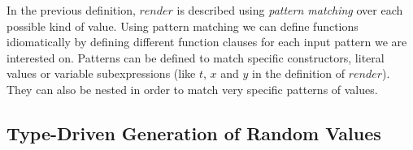 \documentclass[conference, fleqn]{IEEEtran}
\newcommand{\Varid}[1]{\mathit{#1}}
\begin{document}
In the previous definition, \ensuremath{\Varid{render}} is described using \emph{pattern matching}
over each possible kind of value.
%
Using pattern matching we can define functions idiomatically by defining
different function clauses for each input pattern we are interested on.
%
Patterns can be defined to match specific constructors, literal values or
variable subexpressions (like \ensuremath{\Varid{t}}, \ensuremath{\Varid{x}} and \ensuremath{\Varid{y}} in the definition of \ensuremath{\Varid{render}}).
%
They can also be nested in order to match very specific patterns of values.


\subsection*{\textbf{Type-Driven Generation of Random Values}}
\end{document}
